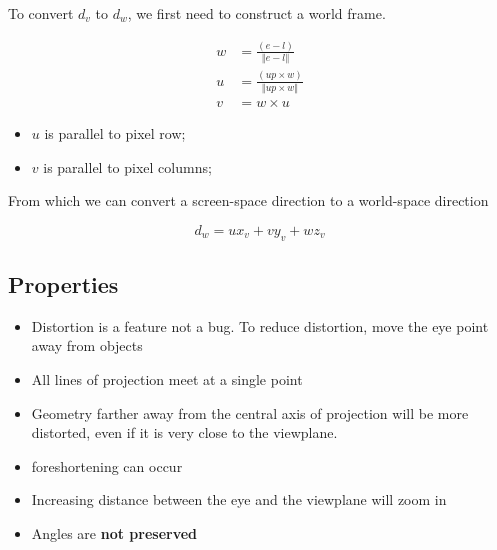     To convert $ d_{v} $ to $ d_{w} $, we first need to construct a world
    frame.

    \begin{align}
      w &= \frac{\left( e - l \right)}{\left\Vert e - l \right\Vert} \\
      u &= \frac{\left( up \times w \right)}{\left\Vert up \times w \right\Vert} \\
      v &= w \times u
    \end{align}

    \begin{itemize}
      \item $ u $ is parallel to pixel row;
      \item $ v $ is parallel to pixel columns;
    \end{itemize}

    From which we can convert a screen-space direction to a world-space direction

    \begin{equation}
      d_{w} = u x_{v} + v y_{v} + w z_{v}
    \end{equation}

  \subsection{Properties}

  \begin{itemize}
    \item Distortion is a feature not a bug. To reduce distortion, move
    the eye point away from objects
    \item All lines of projection meet at a single point
    \item Geometry farther away from the central axis of projection will be
    more distorted, even if it is very close to the viewplane.
    \item \Gls{foreshortening} can occur
    \item Increasing distance between the eye and the viewplane will zoom in
    \item Angles are \textbf{not preserved}
  \end{itemize}
